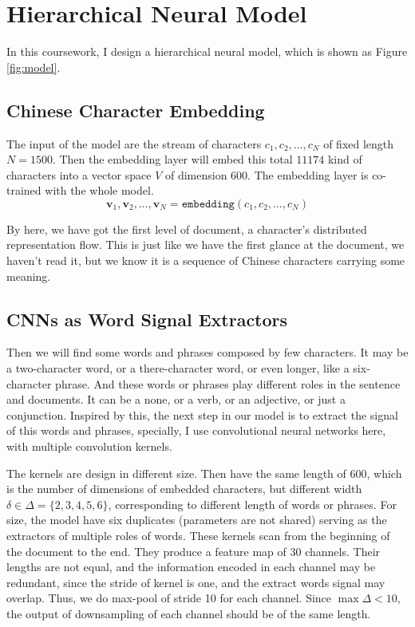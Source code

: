 \documentclass{article}
\begin{document}
\section{Hierarchical Neural Model}\label{sec:method}

In this coursework, I design a hierarchical neural model, which is shown as Figure \ref{fig:model}. 

\subsection{Chinese Character Embedding}

The input of the model are the stream of characters $c_1, c_2, \dots, c_N$ of fixed length $N = 1500$. Then the embedding layer will embed this total $11174$ kind of characters into a vector space $V$ of dimension $600$. The embedding layer is co-trained with the whole model.
\[\bm v_1, \bm v_2, \dots, \bm v_N = \mathtt{embedding}(c_1, c_2, \dots, c_N)\]

By here, we have got the first level of document, a character's distributed representation flow. This is just like we have the first glance at the document, we haven't read it, but we know it is a sequence of Chinese characters carrying some meaning. 

\subsection{CNNs as Word Signal Extractors}

Then we will find some words and phrases composed by few characters. It may be a two-character word, or a there-character word, or even longer, like a six-character phrase. And these words or phrases play different roles in the sentence and documents. It can be a none, or a verb, or an adjective, or just a conjunction. Inspired by this, the next step in our model is to extract the signal of this words and phrases, specially, I use convolutional neural networks here, with multiple convolution kernels.

The kernels are design in different size. Then have the same length of $600$, which is the number of dimensions of embedded characters, but different width $\delta \in \Delta = \{2, 3, 4, 5, 6\}$, corresponding to different length of words or phrases. For size, the model have six duplicates (parameters are not shared) serving as the extractors of multiple roles of words. These kernels scan from the beginning of the document to the end. They produce a feature map of 30 channels. Their lengths are not equal, and the information encoded in each channel may be redundant, since the stride of kernel is one, and the extract words signal may overlap. Thus, we do max-pool of stride 10 for each channel. Since $\max \Delta < 10$, the output of downsampling of each channel should be of the same length.
\end{document}
